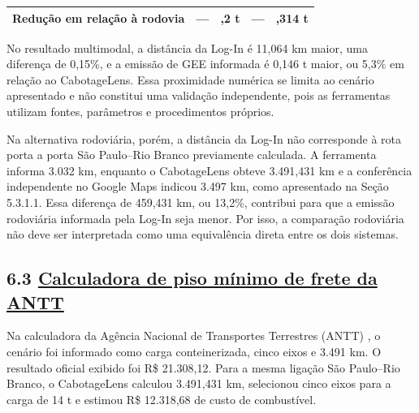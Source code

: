 \documentclass[brazil,]{article}
\let\oldsubsection\subsection
\renewcommand{\subsection}{\Needspace{12\baselineskip}\oldsubsection}
\begin{document}
\begin{longtable}[]{@{}lrrrr@{}}
\begin{minipage}[t]{0.17\columnwidth}\raggedright
Redução em relação à rodovia\strut
\end{minipage} & \begin{minipage}[t]{0.17\columnwidth}\raggedleft
---\strut
\end{minipage} & \begin{minipage}[t]{0.17\columnwidth}\raggedleft
0,2 t\strut
\end{minipage} & \begin{minipage}[t]{0.17\columnwidth}\raggedleft
---\strut
\end{minipage} & \begin{minipage}[t]{0.17\columnwidth}\raggedleft
1,314 t\strut
\end{minipage}\tabularnewline
\bottomrule
\end{longtable}

No resultado multimodal, a distância da Log-In é 11,064 km maior, uma
diferença de 0,15\%, e a emissão de GEE informada é 0,146 t maior, ou
5,3\% em relação ao CabotageLens. Essa proximidade numérica se limita ao
cenário apresentado e não constitui uma validação independente, pois as
ferramentas utilizam fontes, parâmetros e procedimentos próprios.

Na alternativa rodoviária, porém, a distância da Log-In não corresponde
à rota porta a porta São Paulo--Rio Branco previamente calculada. A
ferramenta informa 3.032 km, enquanto o CabotageLens obteve 3.491,431 km
e a conferência independente no Google Maps indicou 3.497 km, como
apresentado na Seção 5.3.1.1. Essa diferença de 459,431 km, ou 13,2\%,
contribui para que a emissão rodoviária informada pela Log-In seja
menor. Por isso, a comparação rodoviária não deve ser interpretada como
uma equivalência direta entre os dois sistemas.

\hypertarget{calculadora-de-piso-muxednimo-de-frete-da-antt}{%
\subsection{\texorpdfstring{6.3
\href{https://calculadorafrete.antt.gov.br/}{Calculadora de piso mínimo
de frete da
ANTT}}{6.3 Calculadora de piso mínimo de frete da ANTT}}\label{calculadora-de-piso-muxednimo-de-frete-da-antt}}

Na calculadora da Agência Nacional de Transportes Terrestres (ANTT)
\parencite{anttfrete2026}, o
cenário foi informado como carga conteinerizada, cinco eixos e 3.491 km.
O resultado oficial exibido foi R\$ 21.308,12. Para a mesma ligação São
Paulo--Rio Branco, o CabotageLens calculou 3.491,431 km, selecionou
cinco eixos para a carga de 14 t e estimou R\$ 12.318,68 de custo de
combustível.
\end{document}
